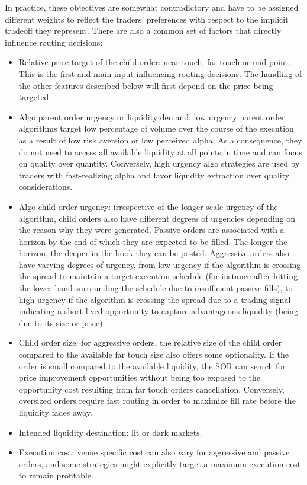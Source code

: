 In practice, these objectives are somewhat contradictory and have to be assigned different weights to reflect the traders' preferences with respect to the implicit tradeoff they represent. There are also a common set of factors that directly influence routing decisions:


\begin{itemize}
\item Relative price target of the child order: near touch, far touch or mid point. This is the first and main input influencing routing decisions. The handling of the other features described below will first depend on the price being targeted.

\item Algo parent order urgency or liquidity demand: low urgency parent order algorithms target low percentage of volume over the course of the execution as a result of low risk aversion or low perceived alpha. As a consequence, they do not need to access all available liquidity at all points in time and can focus on quality over quantity. Conversely, high urgency algo strategies are used by traders with fast-realizing alpha and favor liquidity extraction over quality considerations.

\item Algo child order urgency: irrespective of the longer scale urgency of the algorithm, child orders also have different degrees of urgencies depending on the reason why they were generated. Passive orders are associated with a horizon by the end of which they are expected to be filled. The longer the horizon, the deeper in the book they can be posted. Aggressive orders also have varying degrees of urgency, from low urgency if the algorithm is crossing the spread to maintain a target execution schedule (for instance after hitting the lower band surrounding the schedule due to insufficient passive fills), to high urgency if the algorithm is crossing the spread due to a trading signal indicating a short lived opportunity to capture advantageous liquidity (being due to its size or price).

\item Child order size: for aggressive orders, the relative size of the child order compared to the available far touch size also offers some optionality. If the order is small compared to the available liquidity, the SOR can search for price improvement opportunities without being too exposed to the opportunity cost resulting from far touch orders cancellation. Conversely, oversized orders require fast routing in order to maximize fill rate before the liquidity fades away.

\item Intended liquidity destination: lit or dark markets.

\item Execution cost: venue specific cost can also vary for aggressive and passive orders, and some strategies might explicitly target a maximum execution cost to remain profitable. \twomedskip
\end{itemize}



